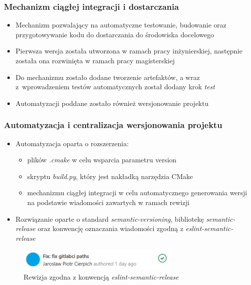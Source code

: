 \documentclass[10pt]{beamer}
\begin{document}
\begin{frame}
\frametitle{Mechanizm ciągłej integracji i dostarczania}
    \begin{itemize}
        \item Mechanizm pozwalający na automatyczne testowanie, budowanie oraz przygotowywanie kodu do dostarczania do środowiska docelowego
        \item Pierwsza wersja została utworzona w ramach pracy inżynierskiej, następnie została ona rozwinięta w ramach pracy magisterskiej
        \item Do mechanizmu zostało dodane tworzenie artefaktów, a wraz z~wprowadzeniem testów automatycznych został dodany krok \emph{test}
        \item Automatyzacji poddane zostało również wersjonowanie projektu
    \end{itemize}
\end{frame}

\begin{frame}
\frametitle{Automatyzacja i centralizacja wersjonowania projektu}
    \begin{itemize}
        \item Automatyzacja oparta o rozszerzenia:
            \begin{itemize}
                \item plików \emph{.cmake} w celu wsparcia parametru version
                \item skryptu \emph{build.py}, który jest nakładką narzędzia CMake
                \item mechanizmu ciągłej integracji w celu automatycznego generowania wersji na podstawie wiadomości zawartych w ramach rewizji
            \end{itemize}
        \item Rozwiązanie oparte o standard \emph{semantic-versioning}, bibliotekę \emph{semantic-release} oraz konwencję oznaczania wiadomości zgodną z \emph{eslint-semantic-release}
    \end{itemize}
\begin{figure}
    \includegraphics[width=0.7\textwidth]{static/commit}
    \caption{Rewizja zgodna z konwencją \emph{eslint-semantic-release}}
\end{figure}
\end{frame}
\end{document}
